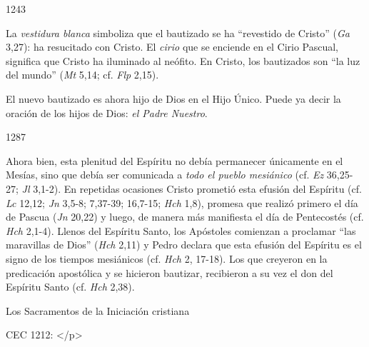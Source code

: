 			\begin{ccebody}\begin{ccenumber}1243\end{ccenumber} La \textit{vestidura blanca} simboliza que el bautizado se ha “revestido de Cristo” (\textit{Ga} 3,27): ha resucitado con Cristo. El \textit{cirio} que se enciende en el Cirio Pascual, significa que Cristo ha iluminado al neófito. En Cristo, los bautizados son “la luz del mundo” (\textit{Mt} 5,14; cf. \textit{Flp} 2,15).\end{ccebody}
			
			\begin{ccebody}El nuevo bautizado es ahora hijo de Dios en el Hijo Único. Puede ya decir la oración de los hijos de Dios: \textit{el Padre Nuestro}.\end{ccebody}
			
			\begin{ccebody}\begin{ccenumber}1287\end{ccenumber} Ahora bien, esta plenitud del Espíritu no debía permanecer únicamente en el Mesías, sino que debía ser comunicada a \textit{todo el pueblo mesiánico} (cf. \textit{Ez} 36,25-27; \textit{Jl} 3,1-2). En repetidas ocasiones Cristo prometió esta efusión del Espíritu (cf. \textit{Lc} 12,12; \textit{Jn} 3,5-8; 7,37-39; 16,7-15; \textit{Hch} 1,8), promesa que realizó primero el día de Pascua (\textit{Jn} 20,22) y luego, de manera más manifiesta el día de Pentecostés (cf. \textit{Hch} 2,1-4). Llenos del Espíritu Santo, los Apóstoles comienzan a proclamar “las maravillas de Dios” (\textit{Hch} 2,11) y Pedro declara que esta efusión del Espíritu es el signo de los tiempos mesiánicos (cf. \textit{Hch} 2, 17-18). Los que creyeron en la predicación apostólica y se hicieron bautizar, recibieron a su vez el don del Espíritu Santo (cf. \textit{Hch} 2,38).\end{ccebody}
			
			\begin{ccetheme}Los Sacramentos de la Iniciación cristiana \end{ccetheme}
			
			\begin{ccereference}\end{ccereference}CEC 1212: </p>
			
